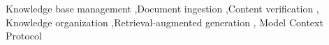 \documentclass[preprint,12pt]{elsarticle}
\begin{document}
\begin{frontmatter}
\begin{keyword}
Knowledge base management \sep Document ingestion \sep Content verification \sep
Knowledge organization \sep Retrieval-augmented generation \sep
Model Context Protocol
\end{keyword}

\end{frontmatter}


















\end{document}
